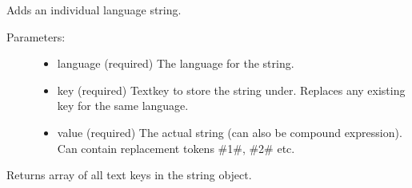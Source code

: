 \documentclass[letterpaper,10pt,english]{sphinxmanual}
\begin{document}
\begin{fulllineitems}

\begin{fulllineitems}
\end{fulllineitems}


\begin{fulllineitems}
\end{fulllineitems}


\begin{fulllineitems}
\label{knop_lang:knop_lang.insert}
Adds an individual language string.
\begin{description}
\item[{Parameters:}] \leavevmode\begin{itemize}
\item {} 
language (required)
The language for the string.

\item {} 
key (required)
Textkey to store the string under. Replaces any existing key for the same language.

\item {} 
value (required)
The actual string (can also be compound expression). Can contain replacement tokens \#1\#, \#2\# etc.

\end{itemize}

\end{description}

\end{fulllineitems}


\begin{fulllineitems}
\label{knop_lang:knop_lang.keys}
Returns array of all text keys in the string object.

\end{fulllineitems}



\begin{fulllineitems}
\end{fulllineitems}


\end{fulllineitems}
\end{document}
